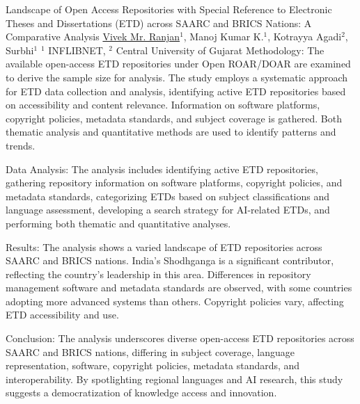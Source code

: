 \begin{abstract_online}{Landscape of Open Access Repositories with Special Reference to Electronic Theses and Dissertations (ETD) across SAARC and BRICS Nations: A Comparative Analysis}{%
    \underline{Vivek Mr. Ranjan}$^{1}$, Manoj Kumar K.$^{1}$, Kotrayya Agadi$^{2}$, Surbhi$^{1}$}{%
    $^1$ INFLIBNET, \newline%
    $^2$ Central University of Gujarat%
}
Methodology: The available open-access ETD repositories under Open ROAR/DOAR are examined to derive the sample size for analysis. The study employs a systematic approach for ETD data collection and analysis, identifying active ETD repositories based on accessibility and content relevance. Information on software platforms, copyright policies, metadata standards, and subject coverage is gathered. Both thematic analysis and quantitative methods are used to identify patterns and trends.

Data Analysis: The analysis includes identifying active ETD repositories, gathering repository information on software platforms, copyright policies, and metadata standards, categorizing ETDs based on subject classifications and language assessment, developing a search strategy for AI-related ETDs, and performing both thematic and quantitative analyses.

Results: The analysis shows a varied landscape of ETD repositories across SAARC and BRICS nations. India's Shodhganga is a significant contributor, reflecting the country's leadership in this area. Differences in repository management software and metadata standards are observed, with some countries adopting more advanced systems than others. Copyright policies vary, affecting ETD accessibility and use.

Conclusion: The analysis underscores diverse open-access ETD repositories across SAARC and BRICS nations, differing in subject coverage, language representation, software, copyright policies, metadata standards, and interoperability. By spotlighting regional languages and AI research, this study suggests a democratization of knowledge access and innovation.

\end{abstract_online}


